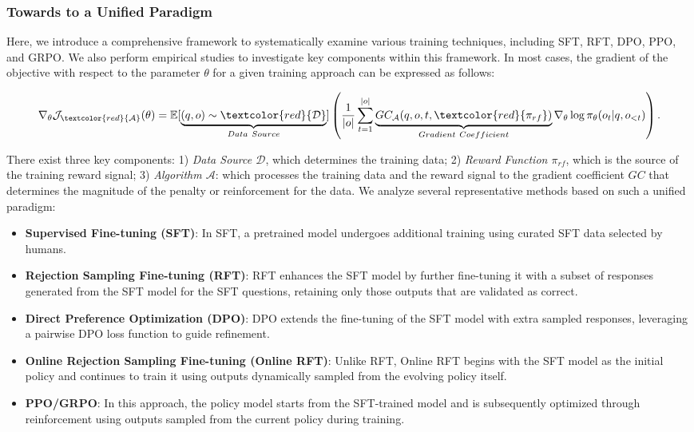 \begin{itemize}[topsep=0pt]
\begin{itemize}[topsep=0pt]
\subsubsection{Towards to a Unified Paradigm} Here, we introduce a comprehensive framework to systematically examine various training techniques, including SFT, RFT, DPO, PPO, and GRPO. We also perform empirical studies to investigate key components within this framework. In most cases, the gradient of the objective with respect to the parameter $\theta$ for a given training approach can be expressed as follows:

\begin{equation}
    \nabla_{\theta}\mathcal{J}_{\textcolor{red}{\mathcal{A}}}(\theta) = \mathbb{E}[\underbrace{(q,o) \sim \textcolor{red}{\mathcal{D}}}_{Data \ Source}]\left( \frac{1}{|o|} \sum_{t=1}^{|o|}  \underbrace{GC_{{\mathcal{A}}}(q, o, t, \textcolor{red}{\pi_{{rf}}})}_{Gradient \ Coefficient}  \nabla_{\theta}\log \pi_{\theta}(o_t | q, o_{<t})\right).
\label{eq:objective}
\end{equation}

There exist three key components: 1) \textit{Data Source $\mathcal{D}$}, which determines the training data; 2) \textit{Reward Function $\pi_{{rf}}$}, which is the source of the training reward signal; 3) \textit{Algorithm $\mathcal{A}$}: which processes the training data and the reward signal to the gradient coefficient $GC$ that determines the magnitude of the penalty or reinforcement for the data. We analyze several representative methods based on such a unified paradigm:

\begin{itemize}
    \item  \textbf{Supervised Fine-tuning (SFT)}: In SFT, a pretrained model undergoes additional training using curated SFT data selected by humans.
    \item \textbf{Rejection Sampling Fine-tuning (RFT)}: RFT enhances the SFT model by further fine-tuning it with a subset of responses generated from the SFT model for the SFT questions, retaining only those outputs that are validated as correct.
    \item \textbf{Direct Preference Optimization (DPO)}: DPO extends the fine-tuning of the SFT model with extra sampled responses, leveraging a pairwise DPO loss function to guide refinement.
    \item \textbf{Online Rejection Sampling Fine-tuning (Online RFT)}: Unlike RFT, Online RFT begins with the SFT model as the initial policy and continues to train it using outputs dynamically sampled from the evolving policy itself.
    \item \textbf{PPO/GRPO}: In this approach, the policy model starts from the SFT-trained model and is subsequently optimized through reinforcement using outputs sampled from the current policy during training.
\end{itemize}


\end{itemize}
\end{itemize}

